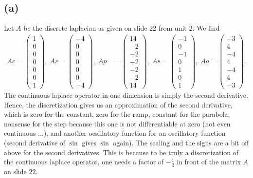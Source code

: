 \subsection*{(a)}
Let $A$ be the discrete laplacian as given on slide 22 from unit 2. We find
\begin{align*}
Ac = \left( \begin{matrix} 1 \\ 0 \\ 0 \\ 0 \\ 0 \\ 0 \\ 1 \end{matrix} \right), \; Ar = \left( \begin{matrix} -4 \\ 0 \\ 0 \\ 0 \\ 0 \\ 0 \\ -4 \end{matrix} \right) , \; Ap & = \left( \begin{matrix} 14 \\ -2 \\ -2 \\ -2 \\ -2 \\ -2 \\ 14 \end{matrix} \right), \; As = \left( \begin{matrix} -1 \\ 0 \\ -1 \\ 0 \\ 1 \\ 0 \\ 1 \end{matrix} \right), \; Ao = \left( \begin{matrix} -3 \\ 4 \\ -4 \\ 4 \\ -4 \\ 4 \\ -3 \end{matrix} \right).
\end{align*}
The continuous laplace operator in one dimension is simply the second derivative. Hence, the discretization gives us an approximation of the second derivative, which is zero for the constant, zero for the ramp, constant for the parabola, nonsense for the step because this one is not differentiable at zero (not even continuous ...), and another ocsillatory function for an oscillatory function (second derivative of $\sin$ gives $\sin$ again). The scaling and the signs are a bit off above for the second derivatives. This is because to be truly a discretization of the continuous laplace operator, one needs a factor of $-\frac{1}{4}$ in front of the matrix $A$ on slide $22$.

